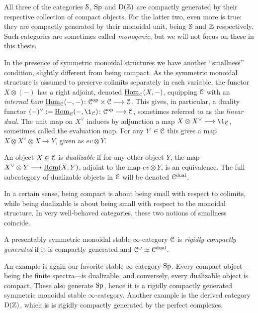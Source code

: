 All three of the categories $\Spaces$, $\Sp$ and $\Der(\Z)$ are compactly generated by their respective collection of compact objects. For the latter two, even more is true: they are compactly generated by their monoidal unit, being $\S$ and $\Z$ respectively. Such categories are sometimes called \emph{monogenic}, but we will not focus on these in this thesis. 

In the presence of symmetric monoidal structures we have another ``smallness'' condition, slightly different from being compact. As the symmetric monoidal structure is assumed to preserve colimits separately in each variable, the functor $X\otimes (-)$ has a right adjoint, denoted $\iHom_\C(X,-)$, equipping $\C$ with an \emph{internal hom} $\iHom_\C(-,-)\: \C\op\times \C\to \C$. This gives, in particular, a duality functor $(-)^\vee:=\iHom_\C(-,\1_\C)\: \C\op \to \C$, sometimes referred to as the \emph{linear dual}. The unit map on $X^\vee$ induces by adjunction a map $X\otimes X^\vee \to \1_\C$, sometimes called the evaluation map. For any $Y\in \C$ this gives a map $X\otimes X^\vee \otimes X\to Y$, given as $ev \otimes Y$. 

\begin{definition}
    \label{ch0:def:dualizable-object}
    An object $X\in \C$ is \emph{dualizable} if for any other object $Y$, the map $X^\vee\otimes Y\to \iHom(X,Y)$, adjoint to the map $ev\otimes Y$, is an equivalence. The full subcategory of dualizable objects in $\C$ will be denoted $\C\dual$. 
\end{definition}

In a certain sense, being compact is about being small with respect to colimits, while being dualizable is about being small with respect to the monoidal structure. In very well-behaved categories, these two notions of smallness coincide. 

\begin{definition}
    \label{ch0:rigidly-generated-category}
    A presentably symmetric monoidal stable $\infty$-category $\C$ is \emph{rigidly compactly generated} if it is compactly generated and $\Co\simeq \C\dual$. 
\end{definition}

\begin{example}
    An example is again our favorite stable $\infty$-category $\Sp$. Every compact object---being the finite spectra---is dualizable, and conversely, every dualizable object is compact. These also generate $\Sp$, hence it is a rigidly compactly generated symmetric monoidal stable $\infty$-category. Another example is the derived category $\Der(\Z)$, which is is rigidly compactly generated by the perfect complexes. 
\end{example}

